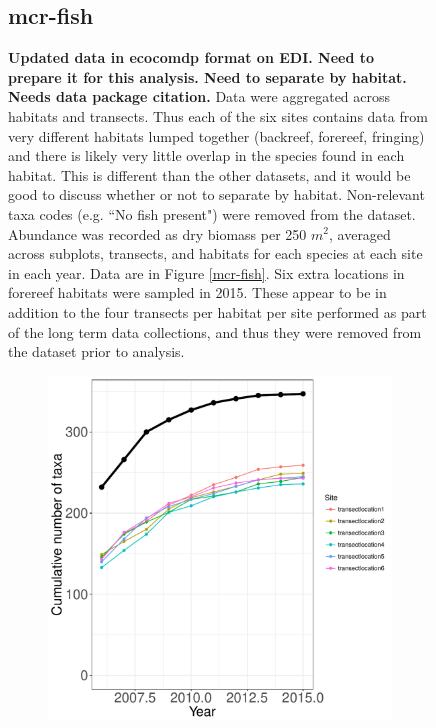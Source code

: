 \documentclass[11pt, oneside]{article}
\begin{document}
\begin{figure}[h!]
\subsection {mcr-fish}
{\bf Updated data in ecocomdp format on EDI. Need to prepare it for this analysis. Need to separate by habitat. Needs data package citation.}
Data were aggregated across habitats and transects.
Thus each of the six sites contains data from very different habitats lumped together (backreef, forereef, fringing) and there is likely very little overlap in the species found in each habitat. 
This is different than the other datasets, and it would be good to discuss whether or not to separate by habitat.
Non-relevant taxa codes (e.g. ``No fish present") were removed from the dataset.
Abundance was recorded as dry biomass per 250 $m^2$, averaged across subplots, transects, and habitats for each species at each site in each year.
Data are in Figure \ref{mcr-fish}.
Six extra locations in forereef habitats were sampled in 2015.
These appear to be in addition to the four transects per habitat per site performed as part of the long term data collections, and thus they were removed from the dataset prior to analysis.
\begin{figure}[h!]
\centering
\includegraphics[scale = 0.4]{mcr-fish-castorani_species_accumulation_curve.pdf}

\end{figure}
\end{figure}
\end{document}
